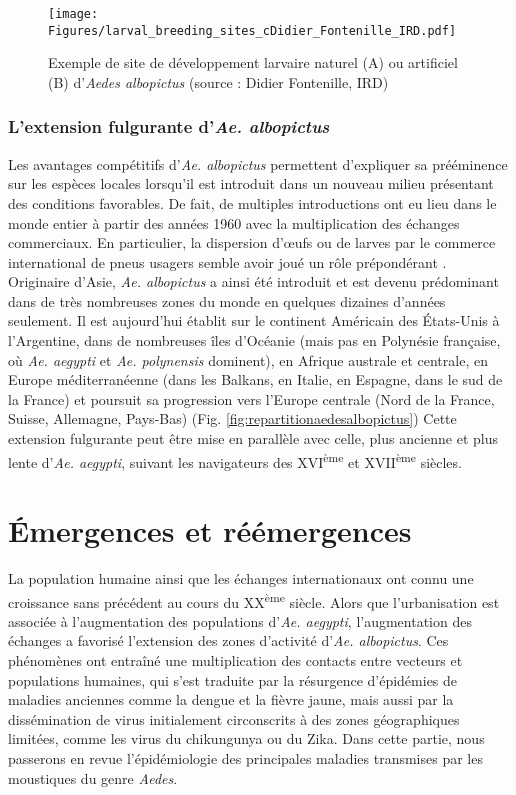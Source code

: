 \begin{figure}[t]
	\centering
	\texttt{[image: Figures/larval\_breeding\_sites\_cDidier\_Fontenille\_IRD.pdf]}
	\caption{Exemple de site de développement larvaire naturel (A) ou artificiel (B) d'{\em Aedes albopictus} (source : Didier Fontenille, IRD)}
	\label{fig:larval_breeding}
\end{figure}

\subsubsection{L'extension fulgurante d'{\em Ae. albopictus}}

Les avantages compétitifs d'{\em Ae. albopictus} permettent d'expliquer sa prééminence sur les espèces locales lorsqu'il est introduit dans un nouveau milieu présentant des conditions favorables.
De fait, de multiples introductions ont eu lieu dans le monde entier à partir des années 1960 avec la multiplication des échanges commerciaux.
En particulier, la dispersion d'\oe ufs ou de larves par le commerce international de pneus usagers semble avoir joué un rôle prépondérant \cite{reiter1998aedes}.
Originaire d'Asie, {\em Ae. albopictus} a ainsi été introduit et est devenu prédominant dans de très nombreuses zones du monde en quelques dizaines d'années seulement.
Il est aujourd'hui établit sur le continent Américain des États-Unis à l'Argentine, dans de nombreuses îles d'Océanie (mais pas en Polynésie française, où {\em Ae. aegypti} et {\em Ae. polynensis} dominent), en Afrique australe et centrale, en Europe méditerranéenne (dans les Balkans, en Italie, en Espagne, dans le sud de la France) et poursuit sa progression vers l'Europe centrale (Nord de la France, Suisse, Allemagne, Pays-Bas) (Fig. \ref{fig:repartitionaedesalbopictus}) \cite{kraemer2015global}
Cette extension fulgurante peut être mise en parallèle avec celle, plus ancienne et plus lente d'{\em Ae. aegypti}, suivant les navigateurs des XVI\textsuperscript{ème} et XVII\textsuperscript{ème} siècles.


\section{Émergences et réémergences}

La population humaine ainsi que les échanges internationaux ont connu une croissance sans précédent au cours du XX\textsuperscript{ème} siècle.
Alors que l'urbanisation est associée à l'augmentation des populations d'{\em Ae. aegypti}, l'augmentation des échanges a favorisé l'extension des zones d'activité d'{\em Ae. albopictus}. 
Ces phénomènes ont entraîné une multiplication des contacts entre vecteurs et populations humaines, qui s'est traduite par la résurgence d'épidémies de maladies anciennes comme la dengue et la fièvre jaune, mais aussi par la dissémination de virus initialement circonscrits à des zones géographiques limitées, comme les virus du chikungunya ou du Zika.
Dans cette partie, nous passerons en revue l'épidémiologie des principales maladies transmises par les moustiques du genre {\em Aedes}.

